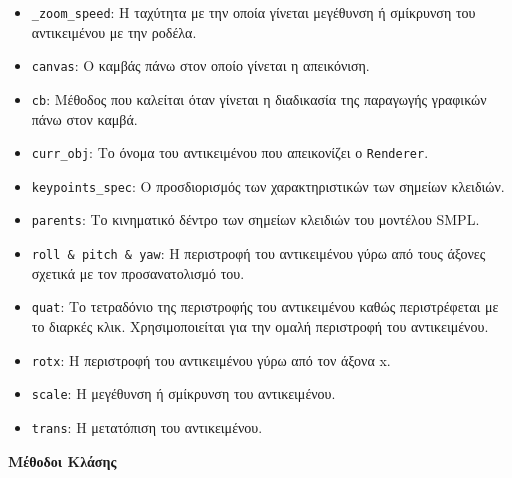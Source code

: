 \begin{itemize}
	\item \texttt{\_zoom\_speed}: Η ταχύτητα με την οποία γίνεται μεγέθυνση ή σμίκρυνση του αντικειμένου με την ροδέλα.
	\item \texttt{canvas}: Ο καμβάς πάνω στον οποίο γίνεται η απεικόνιση. 
	\item \texttt{cb}: Μέθοδος που καλείται όταν γίνεται η διαδικασία της παραγωγής γραφικών πάνω στον καμβά.
	\item \texttt{curr\_obj}: Το όνομα του αντικειμένου που απεικονίζει ο \texttt{Renderer}.
	\item \texttt{keypoints\_spec}: Ο προσδιορισμός των χαρακτηριστικών των σημείων κλειδιών.
	\item \texttt{parents}: Το κινηματικό δέντρο των σημείων κλειδιών του μοντέλου SMPL.
	\item \texttt{roll \& pitch \& yaw}: Η περιστροφή του αντικειμένου γύρω από τους άξονες σχετικά με τον προσανατολισμό του.
	\item \texttt{quat}: Το τετραδόνιο της περιστροφής του αντικειμένου καθώς περιστρέφεται με το διαρκές κλικ. Χρησιμοποιείται για την ομαλή περιστροφή του αντικειμένου.
	\item \texttt{rotx}: Η περιστροφή του αντικειμένου γύρω από τον άξονα x.
	\item \texttt{scale}: Η μεγέθυνση ή σμίκρυνση του αντικειμένου.
	\item \texttt{trans}: Η μετατόπιση του αντικειμένου.
\end{itemize}

\noindent\textbf{Μέθοδοι Κλάσης}

